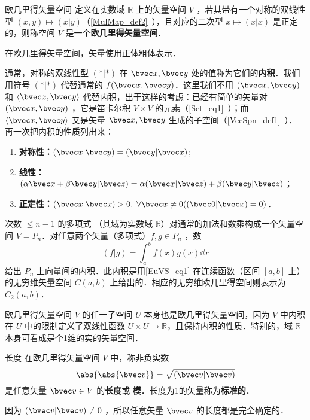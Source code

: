 

\begin{definition}{欧几里得矢量空间}\label{EuVS_def1}
定义在实数域 $\mathbb R$ 上的矢量空间 $V$ ，若其带有一个对称的双线性型 $( x, y)\mapsto( x| y)$（\autoref{MulMap_def2}~），且对应的二次型 $ x\mapsto( x| x)$ 是正定的，则称空间 $V$ 是一个\textbf{欧几里得矢量空间}．
\end{definition}

在欧几里得矢量空间，矢量使用正体粗体表示．

通常，对称的双线性型 $(*|*)$ 在 $\bvec x,\bvec y$ 处的值称为它们的\textbf{内积}．我们用符号 $(*|*)$ 代替通常的 $f(\bvec x,\bvec y)$．这里我们不用 $(\bvec x,\bvec y)$ 和 $\langle\bvec x,\bvec y\rangle$ 代替内积，出于这样的考虑：已经有简单的矢量对 $(\bvec x,\bvec y)$ ，它是笛卡尔积 $V\times V$ 的元素（\autoref{Set_eq1}~）；而 $\langle \bvec x,\bvec y\rangle $ 又是矢量 $\bvec x,\bvec y$ 生成的子空间（\autoref{VecSpn_def1}~）．
再一次把内积的性质列出来：
\begin{enumerate}
\item \textbf{对称性：}$(\bvec x|\bvec y)=(\bvec y|\bvec x)$;
\item \textbf{线性：}$(\alpha\bvec x+\beta\bvec y|\bvec z)=\alpha(\bvec x|\bvec z)+\beta(\bvec y|\bvec z)$；
\item \textbf{正定性：}$(\bvec x|\bvec x)>0,\;\forall\bvec x\neq0((\bvec 0|\bvec x)=0)$．
\end{enumerate}
\begin{example}{}\label{EuVS_ex1}
次数 $\leq n-1$ 的多项式 （其域为实数域 $\mathbb R$）对通常的加法和数乘构成一个矢量空间 $V=P_n$．对任意两个矢量（多项式）$f,g\in P_n$ ，数 
\begin{equation}\label{EuVS_eq1}
(f|g)=\int_a^b f(x)g(x)\dd x
\end{equation}
给出 $P_n$ 上向量间的内积．此内积是用\autoref{EuVS_eq1} 在连续函数（区间 $[a,b]$ 上）的无穷维矢量空间 $C(a,b)$ 上给出的．相应的无穷维欧几里得空间则表示为 $C_2(a,b)$．
\end{example}
\begin{example}{}
欧几里得矢量空间 $V$ 的任一子空间 $U$ 本身也是欧几里得矢量空间，因为 $V$ 中内积在 $U$ 中的限制定义了双线性函数 $U\times U\rightarrow\mathbb R$，且保持内积的性质．特别的，域 $\mathbb R$ 本身可看成是个1维的实的矢量空间．
\end{example}
\begin{definition}{长度}\label{EuVS_def2}
在欧几里得矢量空间 $V$ 中，称非负实数
\begin{equation}
\abs{\abs{\bvec v}}=\sqrt{(\bvec v|\bvec v)}
\end{equation}
是任意矢量 $\bvec v\in V$ 的\textbf{长度}或 \textbf{模}．长度为1的矢量称为\textbf{标准的}．
\end{definition}
因为 $(\bvec v|\bvec v)\neq0$ ，所以任意矢量 $\bvec v$ 的长度都是完全确定的．

